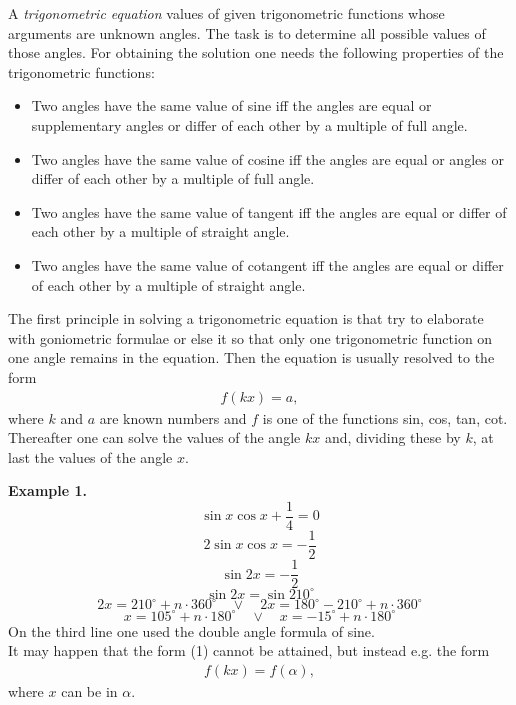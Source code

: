 \documentclass[12pt]{article}
\theoremstyle{definition}
\begin{document}
 

A {\em trigonometric equation}  values of given trigonometric functions whose arguments are unknown angles.  The task is to determine all possible values of those angles.  For obtaining the  solution one needs the following properties of the trigonometric functions:
\begin{itemize}
\item Two angles have the same value of sine iff the angles are equal or supplementary angles or differ of each other by a multiple of full angle. 
\item Two angles have the same value of cosine iff the angles are equal or  angles or differ of each other by a multiple of full angle. 
\item Two angles have the same value of tangent iff the angles are equal or differ of each other by a multiple of straight angle. 
\item Two angles have the same value of cotangent iff the angles are equal or differ of each other by a multiple of straight angle.\\
\end{itemize}


The first principle in solving a trigonometric equation is that try to elaborate with goniometric formulae or else it so that only one trigonometric function on one angle remains in the equation.  Then the equation is usually resolved to the form
\begin{align}
f(kx) = a,
\end{align}
where $k$ and $a$ are known numbers and $f$ is one of the functions sin, cos, tan, cot.  Thereafter one can solve the values of the angle $kx$ and, dividing these by $k$, at last the values of the angle $x$.

\textbf{Example 1.}\, 
$$\sin{x}\cos{x}+\frac{1}{4} = 0$$
$$2\sin{x}\cos{x} = -\frac{1}{2}$$
$$\sin{2x} = -\frac{1}{2}$$
$$\sin{2x} = \sin{210^\circ}$$
$$2x = 210^\circ+n\cdot360^\circ \quad \lor \quad 2x = 180^\circ-210^\circ+n\cdot360^\circ$$
$$x = 105^\circ+n\cdot180^\circ \quad \lor \quad x = -15^\circ+n\cdot180^\circ$$
On the third line one used the double angle formula of sine.\\


It may happen that the form (1) cannot be attained, but instead e.g. the form
\begin{align}
f(kx) = f(\alpha),
\end{align}
where $x$ can be  in $\alpha$.
\end{document}
